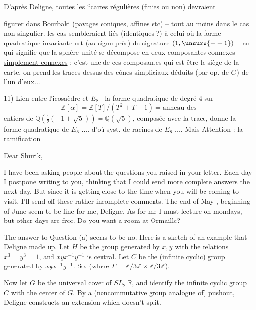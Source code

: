 D'après Deligne, toutes les ``cartes régulières (finies ou non)  devraient


figurer dans Bourbaki (pavages coniques, affines etc) -- tout au moins dans le cas  non singulier.  les cas sembleraient liés (identiques ?) à celui où la forme quadratique invariante est (au signe près) de signature $(1,\unsure{--1})$ -- ce qui signifie que la sphère unité se décompose en deux composantes connexes \uline{simplement connexes} : c'est une de ces composantes qui est  être le siège de la  carte, on prend les traces dessus des cônes simpliciaux déduits (par op. de $G$) de l'un d'eux...

11) Lien entre l'icosaèdre et $E_8$ : la  forme quadratique de degré $4$ sur
\[
\mathbb Z[\alpha]=\mathbb Z[T]/(T^2+T-1)=\text{anneau des}
\]
entiers de $\mathbb Q(\tfrac12(-1\pm\sqrt5))=\mathbb Q(\sqrt5)$, composée avec la trace, donne la forme quadratique de $E_8$ .... d'où syst. de racines de $E_8$ .... Mais Attention : la ramification


Dear Shurik,

I have been asking people about the questions you raised in your letter. Each day I postpone writing to you, thinking that I could send more complete answers the next day. But since it is getting close to the time  when  you will be coming to visit, I'll send off these rather incomplete comments. The end of May , beginning of June seem to be fine for me, Deligne. As for me I must lecture on mondays, but  other days are free. Do you want a room at Ormaille?

The answer to Question (a) seems to be no. Here is a sketch of an example that Deligne made up. Let $H$ be the group generated by $x,y$ with the relations $x^3=y^3=1$, and $xyx^{-1}y^{-1}$ is central. Let $C$ be the (infinite cyclic) group generated by $xyx^{-1}y^{-1}$. So:
(where $\Gamma=\mathbb Z/3\mathbb Z\times\mathbb Z/3\mathbb Z$).

Now let $G$ be the universal cover of $SL_2\ \mathbb R$, and identify the infinite cyclic group $C$ with the center of $G$. By a (noncommutative group analogue of) pushout, Deligne constructs an extension
which doesn't split.

